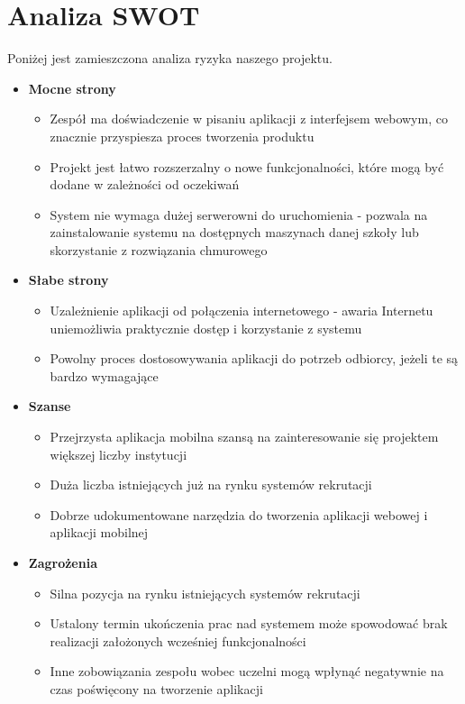 \documentclass{article}
\begin{document}
\section{Analiza SWOT}

Poniżej jest zamieszczona analiza ryzyka naszego projektu. 
\begin{itemize}
    \item \textbf{Mocne strony}
    \begin{itemize}
        \item Zespół ma doświadczenie w pisaniu aplikacji z interfejsem webowym, co znacznie przyspiesza proces tworzenia produktu
        \item Projekt jest łatwo rozszerzalny o nowe funkcjonalności, które mogą być dodane w zależności od oczekiwań 
        \item System nie wymaga dużej serwerowni do uruchomienia - pozwala na zainstalowanie systemu na dostępnych maszynach danej szkoły lub skorzystanie z rozwiązania chmurowego
    \end{itemize}
    
    \item \textbf{Słabe strony}
    \begin{itemize}
        \item Uzależnienie aplikacji od połączenia internetowego - awaria Internetu uniemożliwia praktycznie dostęp i korzystanie z systemu
        \item Powolny proces dostosowywania aplikacji do potrzeb odbiorcy, jeżeli te są bardzo wymagające 
    \end{itemize}
    
    \item \textbf{Szanse}
    \begin{itemize}
        \item Przejrzysta aplikacja mobilna szansą na zainteresowanie się projektem większej liczby instytucji
        \item Duża liczba istniejących już na rynku systemów rekrutacji
        \item Dobrze udokumentowane narzędzia do tworzenia aplikacji webowej i aplikacji mobilnej
    \end{itemize}
    
    \item \textbf{Zagrożenia}
    \begin{itemize}
        \item Silna pozycja na rynku istniejących systemów rekrutacji
        \item Ustalony termin ukończenia prac nad systemem może spowodować brak realizacji założonych wcześniej funkcjonalności
        \item Inne zobowiązania zespołu wobec uczelni mogą wpłynąć negatywnie na czas poświęcony na tworzenie aplikacji
    \end{itemize}
\end{itemize}
\end{document}
